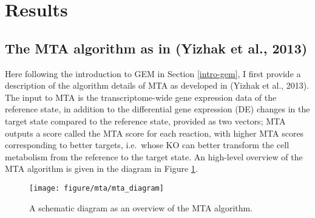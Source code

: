 \documentclass[12pt,twoside,openany,\mydriver]{thesis}  %
\begin{document}
\hypertarget{results}{%
\section{Results}\label{results}}

\hypertarget{the-mta-algorithm-as-in-yizhak_model-based_2013}{%
\subsection{The MTA algorithm as in (Yizhak et al., 2013)}\label{the-mta-algorithm-as-in-yizhak_model-based_2013}}

Here following the introduction to GEM in Section \ref{intro-gem}, I first provide a description of the algorithm details of MTA as developed in (Yizhak et al., 2013). The input to MTA is the transcriptome-wide gene expression data of the reference state, in addition to the differential gene expression (DE) changes in the target state compared to the reference state, provided as two vectors; MTA outputs a score called the MTA score for each reaction, with higher MTA scores corresponding to better targets, i.e.~whose KO can better transform the cell metabolism from the reference to the target state. An high-level overview of the MTA algorithm is given in the diagram in Figure \ref{fig:mta-diagram}.
\begin{figure}
\texttt{[image: figure/mta/mta\_diagram]} \caption{A schematic diagram as an overview of the MTA algorithm.}\label{fig:mta-diagram}
\end{figure}
\end{document}
